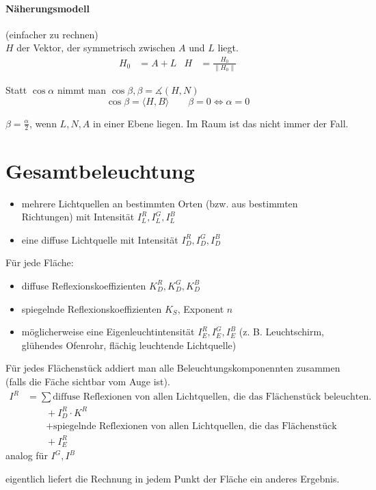 \paragraph*{Näherungsmodell} (einfacher zu rechnen)\\
$H$ der Vektor, der symmetrisch zwischen $A$ und $L$ liegt.
\begin{align*}
 H_0 &= A + L & H &= \frac{H_0}{\|H_0\|} 
\end{align*}
\begin{center}
\end{center}
Statt $\cos \alpha$ nimmt man $\cos \beta, \beta = \measuredangle(H,N)$
\[\cos \beta = \langle H, B \rangle \qquad \beta = 0 \Leftrightarrow \alpha = 0\]
\begin{center}
\end{center}
$\beta = \frac{\alpha}{2}$, wenn $L, N, A$ in einer Ebene liegen. Im Raum ist das nicht immer der Fall.

\section{Gesamtbeleuchtung}
\begin{itemize}
 \item mehrere Lichtquellen an bestimmten Orten (bzw. aus bestimmten Richtungen) mit Intensität $I_L^R, I_L^G, I_L^B$
 \item eine diffuse Lichtquelle mit Intensität $I_D^R, I_D^G, I_D^B$
\end{itemize}
Für jede Fläche:
\begin{itemize}
 \item diffuse Reflexionskoeffizienten $K_D^R, K_D^G, K_D^B$
 \item spiegelnde Reflexionskoeffizienten $K_S$, Exponent $n$
 \item möglicherweise eine Eigenleuchtintensität $I_E^R, I_E^G, I_E^B$ (z. B. Leuchtschirm, glühendes Ofenrohr,
									flächig leuchtende Lichtquelle)
\end{itemize}
Für jedes Flächenstück addiert man alle Beleuchtungskomponennten zusammen (falls die Fäche sichtbar vom Auge ist).
\begin{align*}
 I^R &= \sum \text{diffuse Reflexionen von allen Lichtquellen, die das Flächenstück beleuchten.} \\
	& \qquad + I_D^R \cdot K^R \\
	& \qquad + \text{spiegelnde Reflexionen von allen Lichtquellen, die das Flächenstück beleuchten.} \\
	& \qquad + I_E^R
\end{align*}
analog für $I^G, I^B$
\begin{center}
\end{center}
eigentlich liefert die Rechnung in jedem Punkt der Fläche ein anderes Ergebnis.
